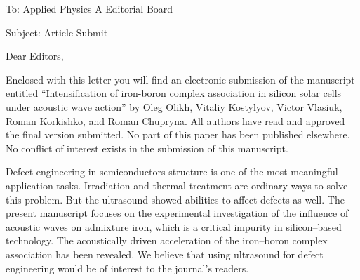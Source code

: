 \documentclass[preprint]{elsarticle}
\begin{document}
To:
Applied Physics A Editorial Board


Subject:
Article Submit

\vspace{5mm}
Dear Editors,

\vspace{3mm}
Enclosed with this letter you will find an electronic submission of the ma\-nu\-script entitled ``Intensification of iron-boron complex association in silicon solar cells under acoustic wave action'' by Oleg Olikh, Vitaliy Kostylyov,
Victor Vlasiuk, Roman Korkishko, and Roman Chupryna.
All authors have read and approved the final version submitted.
No part of this paper has been published elsewhere.
No conflict of interest exists in the submission of this manuscript.

Defect engineering in semiconductors structure is one of the most meaningful application tasks.
Irradiation and thermal treatment are ordinary ways to solve this problem.
But the ultrasound showed abilities to affect defects as well.
The present manuscript focuses on the experimental investigation of the influence of acoustic waves on admixture iron, which is a critical impurity in silicon--based technology.
The acoustically driven acceleration of the iron--boron complex association has been revealed.
We believe that using ultrasound for defect engineering would be of interest to the journal’s readers.




\end{document}
